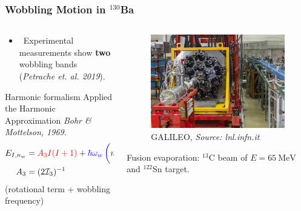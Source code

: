\documentclass{beamer}
\begin{document}
\begin{frame}
	\frametitle{Wobbling Motion in $^{130}$Ba}
	\begin{columns}
		\begin{column}{0.55\textwidth}
			\begin{itemize}
				\item \faSearch\ Experimental measurements show \textbf{two} wobbling bands (\textit{Petrache et. al. 2019}).
			\end{itemize}
			\begin{exampleblock}{Harmonic formalism}
				Applied the Harmonic Approximation \textit{Bohr \& Mottelson, 1969}.
				\begin{align}
					E_{I,n_w}&={\color{red}A_3I(I+1)}+{\color{blue}\hbar\omega_w\left(n_w+\frac{1}{2}\right)}\nonumber\\
					A_3&=(2\mathcal{I}_3)^{-1}\nonumber
				\end{align}
				({\color{red}rotational term} + {\color{blue}wobbling frequency})
			\end{exampleblock}
		\end{column}
		\begin{column}{0.45\textwidth}
			\begin{figure}
				\centering
				\includegraphics[width=0.99\textwidth]{figures/galileo_exp.jpg}
				\caption{GALILEO, \textit{Source: lnl.infn.it}}
			\end{figure}
			Fusion evaporation: $^{13}$C beam of $E=65\ \text{MeV}$ and $^{122}$Sn target.
		\end{column}
	\end{columns}
\end{frame}
\end{document}

